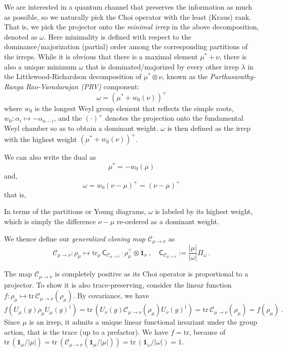 \documentclass[11pt,letterpaper]{article}
\def\tr{\mathrm{tr}}
\def\C{\mathcal{C}}
\begin{document}
We are interested in a quantum channel that preserves the information as much as possible, so we naturally pick the Choi operator with the least (Kraus) rank. That is, we pick the projector onto the \emph{minimal irrep} in the above decomposition, denoted as $\omega$. Here minimality is defined with respect to the dominance/majorization (partial) order among the corresponding partitions of the irreps. While it is obvious that there is a maximal element $\mu^*+\nu$, there is also a unique minimum $\omega$ that is dominated/majorized by every other irrep $\lambda$ in the Littlewood-Richardson decomposition of $\mu^*\otimes\nu$, known as the \emph{Parthasarathy-Ranga Rao-Varadarajan (PRV)} component:
\begin{equation}
    \omega = (\mu^*+w_0(\nu))^+
\end{equation}
where $w_0$ is the longest Weyl group element that reflects the simple roots, $w_0:\alpha_i\mapsto -\alpha_{n-i}$, and the $(\cdot)^+$ denotes the projection onto the fundamental Weyl chamber so as to obtain a dominant weight. $\omega$ is then defined as the irrep with the highest weight $(\mu^*+w_0(\nu))^+$.

We can also write the dual as 
\begin{equation}
    \mu^* = - w_0(\mu)
\end{equation}
and,
\begin{equation}
    \omega =w_0(\nu-\mu)^+ = (\nu-\mu)^+
\end{equation}
that is,

In terms of the partitions or Young diagrams, $\omega$ is labeled by its highest weight, which is simply the difference $\nu-\mu$ re-ordered as a dominant weight.

We thence define our \emph{generalized cloning map} $\C_{\mu\to\nu}$ as
\begin{equation}\label{eq:gen_cloner}
\C_{\mu\to\nu}:\rho_\mu\mapsto\tr_\mu\,\mathsf{C}_{\C_{\mu\to\nu}}\cdot\rho^\top_\mu\otimes \mathbf{1}_\nu\ ,\quad \mathsf{C}_{\C_{\mu\to\nu}} :=\frac{|\mu|}{|\omega|} \Pi_{\omega}\ .
\end{equation}

The map $\C_{\mu\to\nu}$ is completely positive as its Choi operator is proportional to a projector. To show it is also trace-preserving, consider the linear function $f:\rho_\mu\mapsto\tr\,\C_{\mu\to\nu}(\rho_\mu)$. By covariance, we have 
\begin{equation}
    f(U_\mu(g)\rho_\mu U_\mu(g)^\dagger)=\tr\,(U_\nu(g)\C_{\mu\to\nu}(\rho_\mu)U_\nu(g)^\dagger)=\tr\,\C_{\mu\to\nu}(\rho_\mu)=f(\rho_\mu)\ .
\end{equation}
Since $\mu$ is an irrep, it admits a unique linear functional invariant under the group action, that is the trace (up to a prefactor). We have $f=\tr$, because of $\tr\,(\mathbf{1}_\mu/|\mu|) = \tr\, (\C_{\mu\to\nu}(\mathbf{1}_\mu/|\mu|))=\tr\,(\mathbf{1}_{\omega}/|\omega|)=1 $.
\end{document}
